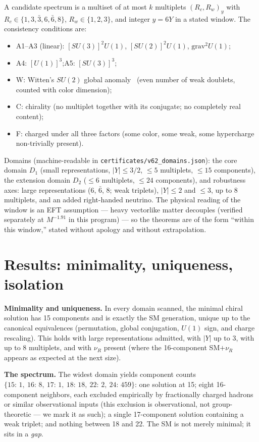 \documentclass[aps,prd,preprint,nofootinbib]{revtex4-2}
\begin{document}
A candidate spectrum is a multiset of at most $k$ multiplets $(R_c,R_w)_y$ with
$R_c\in\{1,3,\bar 3,6,\bar 6,8\}$, $R_w\in\{1,2,3\}$, and integer $y=6Y$ in a
stated window. The consistency conditions are:
\begin{itemize}
\item A1--A3 (linear): $[SU(3)]^2 U(1)$, $[SU(2)]^2 U(1)$, $\mathrm{grav}^2 U(1)$;
\item A4: $[U(1)]^3$;\quad A5: $[SU(3)]^3$;
\item W: Witten's $SU(2)$ global anomaly~\cite{Witten} (even number of weak
      doublets, counted with color dimension);
\item C: chirality (no multiplet together with its conjugate; no completely
      real content);
\item F: charged under all three factors (some color, some weak, some
      hypercharge non-trivially present).
\end{itemize}

Domains (machine-readable in \texttt{certificates/v62\_domains.json}): the core
domain $D_1$ (small representations, $|Y|\le 3/2$, $\le 5$ multiplets, $\le 15$
components), the extension domain $D_2$ ($\le 6$ multiplets, $\le 24$
components), and robustness axes: large representations ($6$, $\bar 6$, $8$;
weak triplets), $|Y|\le 2$ and $\le 3$, up to 8 multiplets, and an added
right-handed neutrino. The physical reading of the window is an EFT assumption
--- heavy vectorlike matter decouples (verified separately at $M^{-1.91}$ in
this program) --- so the theorems are of the form ``within this window,''
stated without apology and without extrapolation.

\section{Results: minimality, uniqueness, isolation}

\textbf{Minimality and uniqueness.} In every domain scanned, the minimal chiral
solution has 15 components and is exactly the SM generation, unique up to the
canonical equivalences (permutation, global conjugation, $U(1)$ sign, and
charge rescaling). This holds with large representations admitted, with $|Y|$
up to 3, with up to 8 multiplets, and with $\nu_R$ present (where the
16-component SM$+\nu_R$ appears as expected at the next size).

\textbf{The spectrum.} The widest domain yields component counts
$\{15{:}\,1,\ 16{:}\,8,\ 17{:}\,1,\ 18{:}\,18,\ 22{:}\,2,\ 24{:}\,459\}$: one
solution at 15; eight 16-component neighbors, each excluded empirically by
fractionally charged hadrons or similar observational inputs (this exclusion is
observational, not group-theoretic --- we mark it as such); a single
17-component solution containing a weak triplet; and nothing between 18 and 22.
The SM is not merely minimal; it sits in a \emph{gap}.
\end{document}
